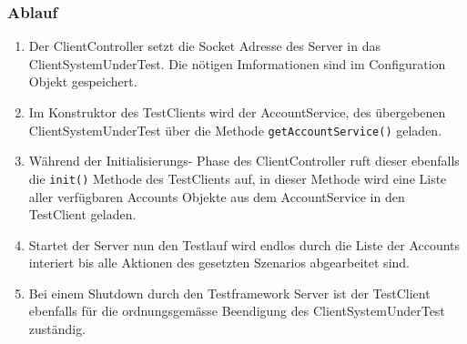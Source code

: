 \subsubsection{Ablauf}
\label{sec:ablauf}
\begin{enumerate}
\item Der ClientController setzt die Socket Adresse des Server in das Client\-System\-Under\-Test. Die nötigen Imformationen sind im Configuration Objekt gespeichert.
\item Im Kon\-struk\-tor des Test\-Clients wird der Account\-Ser\-vice, des über\-ge\-be\-nen Client\-System\-Under\-Test über die Meth\-ode \texttt{get\allowbreak Account\allowbreak Ser\allowbreak vice()} ge\-la\-den. 
\item Während der Initialisierungs- Phase des ClientController ruft dieser ebenfalls die \verb+init()+ Methode des TestClients auf, in dieser Methode wird eine Liste aller verfügbaren Accounts Objekte aus dem AccountService in den TestClient geladen.
\item Startet der Server nun den Testlauf wird endlos durch die Liste der Accounts interiert bis alle Aktionen des gesetzten Szenarios abgearbeitet sind.
\item Bei einem Shutdown durch den Testframework Server ist der TestClient ebenfalls für die ord\-nungs\-ge\-mä\-sse Be\-en\-di\-gung des ClientSystemUnderTest zu\-stän\-dig.
\end{enumerate}

